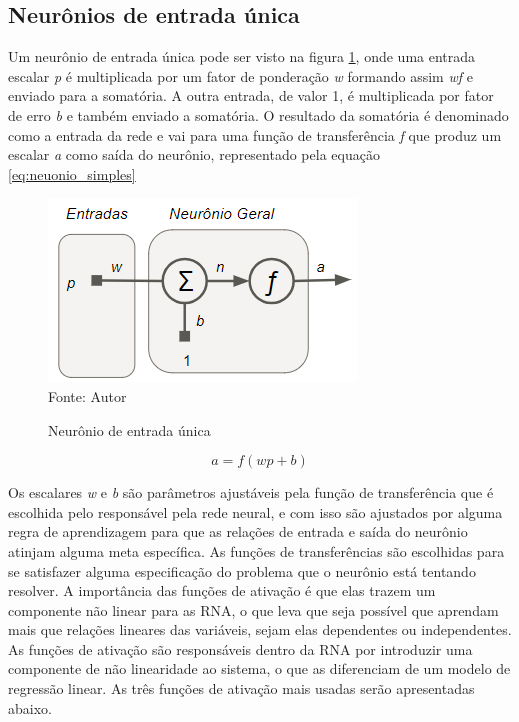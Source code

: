 \documentclass[
	12pt,				%
    oneside,			%
	a4paper,			%
	english,			%
	french,				%
	spanish,			%
	brazil,				%
	]{abntex2}
\begin{document}
\subsection {Neurônios de entrada única}

Um neurônio de entrada única pode ser visto na figura \ref{fig:Neurônio_geral1}, onde uma entrada escalar \textit{p} é multiplicada por um fator de ponderação \textit{w} formando assim \textit{wf} e enviado para a somatória. A outra entrada, de valor 1, é multiplicada por fator de erro \textit{b} e também enviado a somatória. O resultado da somatória é denominado como a entrada da rede e vai para uma função de transferência \textit{f} que produz um escalar \textit{a} como saída do neurônio,  representado pela equação \ref{eq:neuonio_simples}

\begin{figure}[H]
    \centering
    \caption{Neurônio de entrada única}
    \includegraphics[scale=1]{Neuronio_geral1}\\
    Fonte: Autor\hfill
    \label{fig:Neurônio_geral1}
\end{figure}

  \begin{equation}
    a = {f(wp+b)}
    \label{eq:neuonio_simples}
  \end{equation}


 Os escalares \textit{w} e \textit{b} são parâmetros ajustáveis pela função de transferência que é escolhida pelo responsável pela rede neural, e com isso são ajustados por alguma regra de aprendizagem para que as relações de entrada e saída do neurônio atinjam alguma meta específica.
As funções de transferências são escolhidas para se satisfazer alguma especificação do problema que o neurônio está tentando resolver. A importância das funções de ativação é que elas trazem um componente não linear para as RNA, o que leva que seja possível que aprendam mais que relações lineares das variáveis, sejam elas dependentes ou independentes. As funções de ativação são responsáveis dentro da RNA por introduzir uma componente de não linearidade ao sistema, o que as diferenciam de um modelo de regressão linear. As três funções de ativação mais usadas serão apresentadas abaixo.
\end{document}
